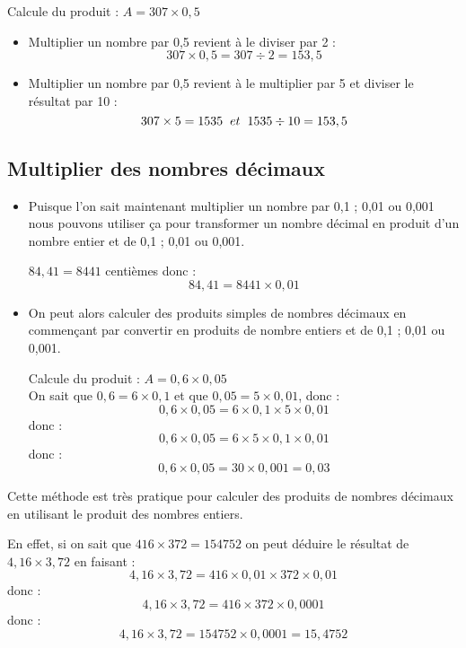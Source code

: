 \begin{pageCours}
\begin{Ex}
Calcule du produit : $A=307\times0,5$
\begin{itemize}
\item Multiplier un nombre par 0,5 revient à le diviser par 2 :
\[307\times0,5=307\div 2=153,5\]
\item Multiplier un nombre par 0,5 revient à le multiplier par 5 et diviser le résultat par 10 :
\[307\times5=1535\hspace{.2cm}et\hspace{.2cm}1535\div10=153,5\]
\end{itemize}
\end{Ex}

\subsection{Multiplier des nombres décimaux}

\begin{Mt}
\begin{itemize}
\item Puisque l'on sait maintenant multiplier un nombre par 0,1 ; 0,01 ou 0,001 nous pouvons utiliser ça pour transformer un nombre décimal en produit d'un nombre entier et de 0,1 ; 0,01 ou 0,001.

\begin{Ex}
$84,41=8441$ centièmes donc :
\[84,41=8441\times0,01\]
\end{Ex}
\item On peut alors calculer des produits simples de nombres décimaux en commençant par convertir en produits de nombre entiers et de 0,1 ; 0,01 ou 0,001.
\begin{Ex}
Calcule du produit : $A=0,6\times0,05$\\
On sait que $0,6=6\times0,1$ et que $0,05=5\times0,01$, donc :
\[0,6\times0,05=6\times0,1\times5\times0,01\]
donc :
\[0,6\times0,05=6\times5\times0,1\times0,01\]
donc :
\[0,6\times0,05=30\times0,001=0,03\]
\end{Ex}
\end{itemize}
\end{Mt}

\begin{Ex}
Cette méthode est très pratique pour calculer des produits de nombres décimaux en utilisant le produit des nombres entiers.

En effet, si on sait que  $416\times372=154752$ on peut déduire le résultat de $4,16\times3,72$ en faisant :
\[4,16\times3,72=416\times
0,01\times372\times0,01\]
donc : \[4,16\times3,72=416\times372\times0,0001\]
donc :
\[4,16\times3,72=154752\times0,0001=15,4752\]
\end{Ex}


\end{pageCours}
